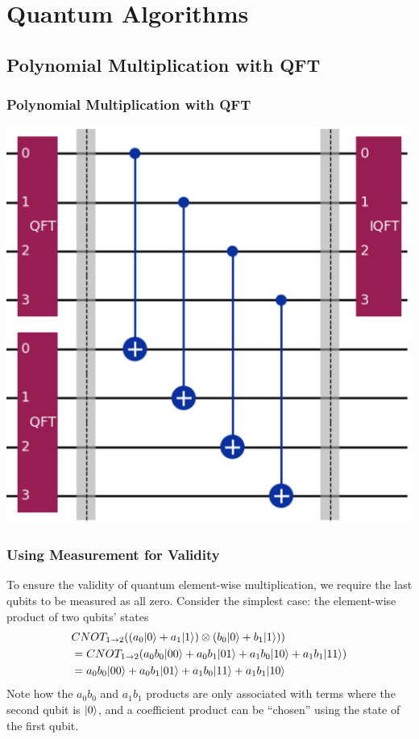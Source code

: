 \documentclass[
	11pt, %
]{beamer}
\begin{document}
\section{Quantum Algorithms}
\subsection{Polynomial Multiplication with QFT}
\begin{frame}
    \frametitle{Polynomial Multiplication with QFT}
    \begin{center}
        \includegraphics[scale=0.7]{basic_circuit.PNG}
    \end{center}
\end{frame}


\begin{frame}
    \frametitle{Using Measurement for Validity}
 To ensure the validity of quantum element-wise multiplication, 
    we require the last qubits to be measured as all zero.
    \newline\newline
    Consider the simplest case: the element-wise product of two qubits' states
    \begin{align*}
        &CNOT_{1\to 2}((a_0\rvert0\rangle + a_1\rvert1\rangle) \otimes (b_0\rvert0\rangle + b_1\rvert1\rangle)) \\
        &= CNOT_{1\to 2}(a_0b_0\rvert00\rangle + a_0b_1\rvert01\rangle + a_1b_0\rvert10\rangle + a_1b_1\rvert11\rangle) \\
        &= a_0b_0\rvert00\rangle + a_0b_1\rvert01\rangle + a_1b_0\rvert11\rangle + a_1b_1\rvert10\rangle \\
    \end{align*}
    Note how the $a_0b_0$ and $a_1b_1$ products are only associated with terms where the second qubit is $\rvert0\rangle$, 
    and a coefficient product can be ``chosen'' using the state of the first qubit.
\end{frame}
\end{document}
